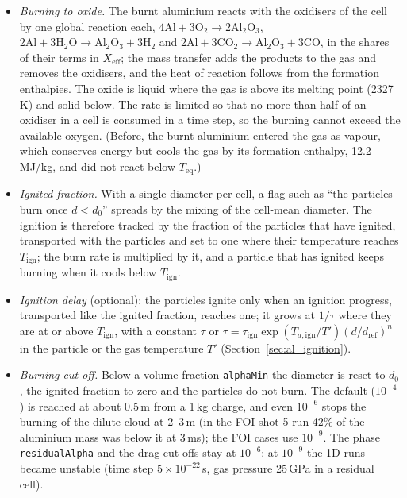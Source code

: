 \documentclass{article}
\begin{document}
\begin{itemize}
    \item \emph{Burning to oxide.} The burnt aluminium reacts with the oxidisers of the cell by one global reaction each, $4\text{Al} + 3\text{O}_2 \to 2\text{Al}_2\text{O}_3$, $2\text{Al} + 3\text{H}_2\text{O} \to \text{Al}_2\text{O}_3 + 3\text{H}_2$ and $2\text{Al} + 3\text{CO}_2 \to \text{Al}_2\text{O}_3 + 3\text{CO}$, in the shares of their terms in $X_\text{eff}$; the mass transfer adds the products to the gas and removes the oxidisers, and the heat of reaction follows from the formation enthalpies. The oxide is liquid where the gas is above its melting point (2327\,K) and solid below. The rate is limited so that no more than half of an oxidiser in a cell is consumed in a time step, so the burning cannot exceed the available oxygen. (Before, the burnt aluminium entered the gas as vapour, which conserves energy but cools the gas by its formation enthalpy, 12.2\,MJ/kg, and did not react below $T_\text{eq}$.)
    \item \emph{Ignited fraction.} With a single diameter per cell, a flag such as ``the particles burn once $d < d_0$'' spreads by the mixing of the cell-mean diameter. The ignition is therefore tracked by the fraction of the particles that have ignited, transported with the particles and set to one where their temperature reaches $T_\text{ign}$; the burn rate is multiplied by it, and a particle that has ignited keeps burning when it cools below $T_\text{ign}$.
    \item \emph{Ignition delay} (optional): the particles ignite only when an ignition progress, transported like the ignited fraction, reaches one; it grows at $1/\tau$ where they are at or above $T_\text{ign}$, with a constant $\tau$ or $\tau = \tau_\text{ign}\exp(T_{a,\text{ign}}/T')(d/d_\text{ref})^n$ in the particle or the gas temperature $T'$ (Section~\ref{sec:al_ignition}).
    \item \emph{Burning cut-off.} Below a volume fraction \texttt{alphaMin} the diameter is reset to $d_0$, the ignited fraction to zero and the particles do not burn. The default ($10^{-4}$) is reached at about 0.5\,m from a 1\,kg charge, and even $10^{-6}$ stops the burning of the dilute cloud at 2--3\,m (in the FOI shot 5 run 42\% of the aluminium mass was below it at 3\,ms); the FOI cases use $10^{-9}$. The phase \texttt{residualAlpha} and the drag cut-offs stay at $10^{-6}$: at $10^{-9}$ the 1D runs became unstable (time step $5\times10^{-22}$\,s, gas pressure 25\,GPa in a residual cell).
\end{itemize}
\end{document}
